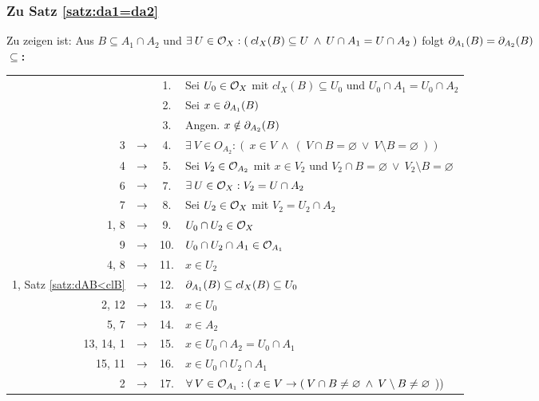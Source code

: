

\subsubsection{Zu Satz \ref{satz:da1=da2}}\label{anh:da1=da2}
    Zu zeigen ist: Aus $B \subseteq A_1 \cap A_2$ und  $\exists\: U \in \mathcal{O}_X : (\: cl_X(B) \subseteq U \:\land\: U \cap A_1 = U \cap A_2 \:)$ folgt $\partial_{A_1}(B) = \partial_{A_2}(B)$ \\

    \noindent
    \textbf{\glqq$\boldsymbol{\subseteq}$\grqq:}

    \begin{longtable}{r c c l}
        & & 1. & Sei $U_0 \in \mathcal{O}_X$ mit $cl_X(B) \subseteq U_0$ und $U_0 \cap A_1 = U_0 \cap A_2$ \\
        & & 2. & Sei $x \in \partial_{A_1}(B)$ \\
        & & 3. & Angen. $x \notin \partial_{A_2}(B)$ \\
        3 & $\rightarrow$ & 4. & $\exists\: V \in O_{A_2} : (\: x \in V \:\land\: (\: V \cap B = \varnothing \:\lor\: V \setminus B = \varnothing \:))$ \\
        4 & $\rightarrow$ & 5. & Sei $V_2 \in \mathcal{O}_{A_2}$ mit $x \in V_2$ und $V_2 \cap B = \varnothing \:\lor\: V_2 \setminus B = \varnothing$\\
        6 & $\rightarrow$ & 7. & $\exists\: U \in \mathcal{O}_X : V_2 = U \cap A_2$ \\
        7 & $\rightarrow$ & 8. & Sei $U_2 \in \mathcal{O}_X$ mit $V_2 = U_2 \cap A_2$ \\
        1, 8 & $\rightarrow$ & 9. & $U_0 \cap U_2 \in \mathcal{O}_X$ \\
        9 & $\rightarrow$ & 10. & $U_0 \cap U_2 \cap A_1 \in \mathcal{O}_{A_1}$ \\
        4, 8 & $\rightarrow$ & 11. & $x \in U_2$\\
        1, Satz \ref{satz:dAB<clB} & $\rightarrow$ & 12. & $\partial_{A_1}(B) \subseteq cl_X(B) \subseteq U_0$ \\
        2, 12 & $\rightarrow$ & 13. & $x \in U_0$ \\
        5, 7 & $\rightarrow$ & 14. & $x \in A_2$ \\
        13, 14, 1 & $\rightarrow$ & 15. &  $x \in U_0 \cap A_2 = U_0 \cap A_1$ \\
        15, 11 & $\rightarrow$ & 16. & $x \in U_0 \cap U_2 \cap A_1$ \\
        2 & $\rightarrow$ & 17. & $\forall\: V \in \mathcal{O}_{A_1} : (\: x \in V \to (\: V \cap B \neq \varnothing \:\land\: V \setminus B \neq \varnothing$ \:)) \\

\end{longtable}
